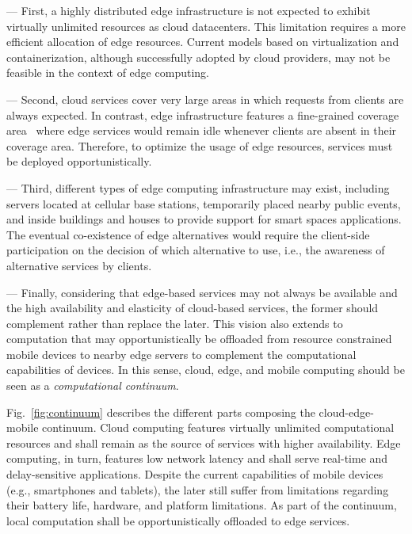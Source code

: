 
--- First, a highly distributed edge infrastructure is not expected to exhibit virtually unlimited resources as cloud datacenters. This limitation requires a more efficient allocation of edge resources. Current models based on virtualization and containerization, although successfully adopted by cloud providers, may not be feasible in the context of edge computing.


--- Second, cloud services cover very large areas in which requests from clients are always expected. In contrast, edge infrastructure features a fine-grained coverage area~\cite{Dehos14millimeter5g} where edge services would remain idle whenever clients are absent in their coverage area. Therefore, to optimize the usage of edge resources, services must be deployed opportunistically.



--- Third, different types of edge computing infrastructure may exist, including servers located at cellular base stations, temporarily placed nearby public events, and inside buildings and houses to provide support for smart spaces applications. The eventual co-existence of edge alternatives would require the client-side participation on the decision of which alternative to use, i.e., the awareness of alternative services by clients.




--- Finally, considering that edge-based services may not always be available and the high availability and elasticity of cloud-based services, the former should complement rather than replace the later. This vision also extends to computation that may opportunistically be offloaded from resource constrained mobile devices to nearby edge servers to complement the computational capabilities of devices. In this sense, cloud, edge, and mobile computing should be seen as a \textit{computational continuum}. 

Fig.~\ref{fig:continuum} describes the different parts composing the cloud-edge-mobile continuum. Cloud computing features virtually unlimited computational resources and shall remain as the source of services with higher availability. Edge computing, in turn, features low network latency and shall serve real-time and delay-sensitive applications. Despite the current capabilities of mobile devices (e.g., smartphones and tablets), the later still suffer from limitations regarding their battery life, hardware, and platform limitations. As part of the continuum, local computation shall be opportunistically offloaded to edge services. 


